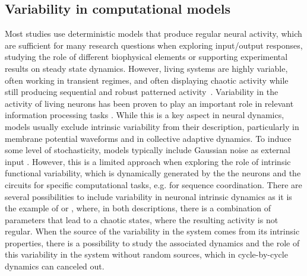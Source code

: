 \subsection{Variability in computational models}

Most studies use deterministic models that produce regular neural activity, which are sufficient for many research questions when exploring input/output responses, studying the role of different biophysical elements or supporting experimental results on steady state dynamics. However, living systems are highly variable, often working in transient regimes, and often displaying chaotic activity while still producing sequential and robust patterned activity~\parencite{selverston_reliable_2000}. Variability in the activity of living neurons has been proven to play an important role in relevant information processing tasks \parencite{ding_dynamic_2011,renart_variability_2014,masquelier_neural_2013,hutt_intrinsic_2023,ribeiro_trialbytrial_2024}. While this is a key aspect in neural dynamics, models usually exclude intrinsic variability from their description,  particularly in membrane potential waveforms and in collective adaptive dynamics. To induce some level of stochasticity, models typically include Gaussian noise as external input \parencite{linaro_accurate_2011,pezo_diffusion_2014,zheng_spontaneous_2020}. However, this is a limited approach when exploring the role of intrinsic functional variability, which is  dynamically generated by the the neurons and the circuits for specific computational tasks, e.g. for sequence coordination. There are several possibilities to include variability in neuronal intrinsic dynamics as it is the example of \textcite{hindmarsh_model_1984} or \textcite{komendantov_deterministic_1996}, where, in both descriptions, there is a combination of parameters that lead  to a chaotic states, where the resulting activity is not regular. When the source of the variability in the system comes from its intrinsic properties, there is a possibility to study the associated dynamics and the role of this variability in the system without random sources, which in cycle-by-cycle dynamics can canceled out.


